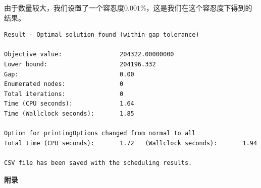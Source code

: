 \documentclass[UTF8]{article}%
\begin{document}
由于数量较大，我们设置了一个容忍度\(0.001\%\)，这是我们在这个容忍度下得到的结果。
\begin{lstlisting}
Result - Optimal solution found (within gap tolerance)

Objective value:                204322.00000000
Lower bound:                    204196.332
Gap:                            0.00
Enumerated nodes:               0
Total iterations:               0
Time (CPU seconds):             1.64
Time (Wallclock seconds):       1.85

Option for printingOptions changed from normal to all
Total time (CPU seconds):       1.72   (Wallclock seconds):       1.94

CSV file has been saved with the scheduling results.
\end{lstlisting}










\clearpage
\begin{center}
    \huge \bf 附录
\end{center}
\appendix
\end{document}
